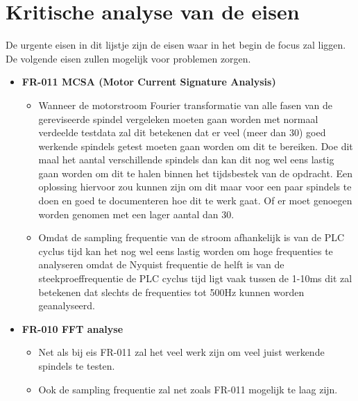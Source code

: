 \section{Kritische analyse van de eisen}

De urgente eisen in dit lijstje zijn de eisen waar in het begin de focus zal liggen. De volgende eisen zullen mogelijk voor problemen zorgen.

\begin{itemize}
	\item \textbf{FR-011 \gls{MCSA} (Motor Current Signature Analysis)}
	\begin{itemize}
		\item Wanneer de motorstroom Fourier transformatie van alle fasen van de gereviseerde spindel vergeleken moeten gaan worden met normaal verdeelde testdata zal dit betekenen dat er veel (meer dan 30) goed werkende spindels getest moeten gaan worden om dit te bereiken. Doe dit maal het aantal verschillende spindels dan kan dit nog wel eens lastig gaan worden om dit te halen binnen het tijdsbestek van de opdracht. Een oplossing hiervoor zou kunnen zijn om dit maar voor een paar spindels te doen en goed te documenteren hoe dit te werk gaat. Of er moet genoegen worden genomen met een lager aantal dan 30.
		
		\item Omdat de sampling frequentie van de stroom afhankelijk is van de \gls{PLC} cyclus tijd kan het nog wel eens lastig worden om hoge frequenties te analyseren omdat de Nyquist frequentie de helft is van de steekproeffrequentie de \gls{PLC} cyclus tijd ligt vaak tussen de 1-10\gls{ms} dit zal betekenen dat slechts de frequenties tot 500\gls{Hz} kunnen worden geanalyseerd.
	\end{itemize}
	
	\item \textbf{FR-010 \gls{FFT} analyse}
	\begin{itemize}
		\item Net als bij eis FR-011 zal het veel werk zijn om veel juist werkende spindels te testen.
		\item Ook de sampling frequentie zal net zoals FR-011 mogelijk te laag zijn.
	\end{itemize}
\end{itemize}